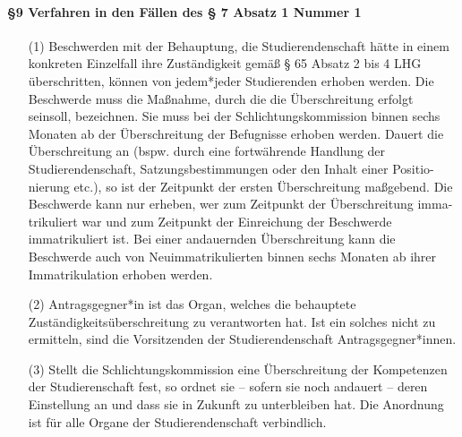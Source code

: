         \paragraph{§9 Verfahren in den Fällen des § 7 Absatz 1 Nummer 1}
            \begin{itemize}
                \item[(1)] Beschwerden mit der Behauptung, die Studierendenschaft hätte in einem konkreten Einzelfall ihre Zuständigkeit gemäß § 65 Absatz 2 bis 4 LHG überschritten, können von jedem*jeder Studierenden erhoben werden. Die Beschwerde muss die Maßnahme, durch die die Überschreitung erfolgt seinsoll, bezeichnen. Sie muss bei der Schlichtungskommission binnen sechs Monaten ab der Überschreitung der Befugnisse erhoben werden. Dauert die Überschreitung an (bspw. durch eine fortwährende Handlung der Studierendenschaft, Satzungsbestimmungen oder den Inhalt einer Positio-nierung etc.), so ist der Zeitpunkt der ersten Überschreitung maßgebend. Die Beschwerde kann nur erheben, wer zum Zeitpunkt der Überschreitung imma-trikuliert war und zum Zeitpunkt der Einreichung der Beschwerde immatrikuliert ist. Bei einer andauernden Überschreitung kann die Beschwerde auch von Neuimmatrikulierten binnen sechs Monaten ab ihrer Immatrikulation erhoben werden.
                \item[(2)] Antragsgegner*in ist das Organ, welches die behauptete Zuständigkeitsüberschreitung zu verantworten hat. Ist ein solches nicht zu ermitteln, sind die Vorsitzenden der Studierendenschaft Antragsgegner*innen.
                \item[(3)]  Stellt die Schlichtungskommission eine Überschreitung der Kompetenzen der Studierenschaft fest, so ordnet sie – sofern sie noch andauert – deren Einstellung an und dass sie in Zukunft zu unterbleiben hat. Die Anordnung ist für alle Organe der Studierendenschaft verbindlich.
            \end{itemize}
